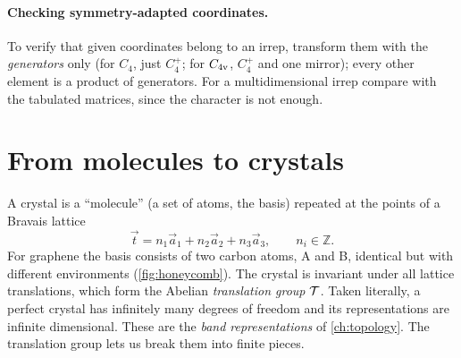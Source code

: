 \paragraph{Checking symmetry-adapted coordinates.} To verify that given coordinates
belong to an irrep, transform them with the \emph{generators} only (for $C_4$, just
$C_4^+$; for $C_{4\mathrm{v}}$, $C_4^+$ and one mirror); every other element is a product of
generators. For a multidimensional irrep compare with the tabulated matrices, since
the character is not enough.

\section{From molecules to crystals}

A crystal is a ``molecule'' (a set of atoms, the basis) repeated at the points of a
Bravais lattice
\[
\vec{t}=n_1\vec{a}_1+n_2\vec{a}_2+n_3\vec{a}_3,\qquad n_i\in\mathbb{Z}.
\]
For graphene the basis consists of two carbon atoms, A and B, identical but with
different environments (\cref{fig:honeycomb}). The crystal is invariant under all
lattice translations, which form the Abelian \emph{translation group} $\mathcal{T}$.
Taken literally, a perfect crystal has infinitely many degrees of freedom and its
representations are infinite dimensional. These are the \emph{band representations}
of \cref{ch:topology}. The translation group lets us break them into finite pieces.

